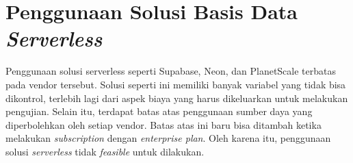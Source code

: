 \section{Penggunaan Solusi Basis Data \textit{Serverless}}

Penggunaan solusi serverless seperti Supabase, Neon, dan PlanetScale terbatas pada vendor tersebut. Solusi seperti ini memiliki banyak variabel yang tidak bisa dikontrol, terlebih lagi dari aspek biaya yang harus dikeluarkan untuk melakukan pengujian. Selain itu, terdapat batas atas penggunaan sumber daya yang diperbolehkan oleh setiap vendor. Batas atas ini baru bisa ditambah ketika melakukan \textit{subscription} dengan \textit{enterprise plan}. Oleh karena itu, penggunaan solusi \textit{serverless} tidak \textit{feasible} untuk dilakukan.